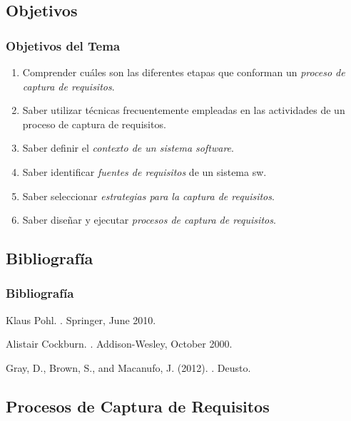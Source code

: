 \documentclass[a4paper,t,xcolor=pst,dvips]{beamer}
\begin{document}
\subsection{Objetivos}

\begin{frame}[c]
    \frametitle{Objetivos del Tema}
    \begin{enumerate}[<+->]
         \item Comprender cuáles son las diferentes etapas que conforman un \emph{proceso de captura de requisitos}.
         \item Saber utilizar técnicas frecuentemente empleadas en las actividades de un proceso de captura de requisitos.
         \item Saber definir el \emph{contexto de un sistema software}.
         \item Saber identificar \emph{fuentes de requisitos} de un sistema sw.
         \item Saber seleccionar \emph{estrategias para la captura de requisitos}.
         \item Saber diseñar y ejecutar \emph{procesos de captura de requisitos}.
    \end{enumerate}
\end{frame}

\subsection{Bibliografía}

\begin{frame}[c]
    \frametitle{Bibliografía}
    \begin{thebibliography}{1}

     Klaus Pohl. .
    \newblock Springer, June 2010.

     Alistair Cockburn. .
    \newblock Addison-Wesley, October 2000.

    Gray, D., Brown, S., and Macanufo, J. (2012).
    .
    \newblock Deusto.
\end{thebibliography}
\end{frame}

\subsection{Procesos de Captura de Requisitos}
\end{document}
